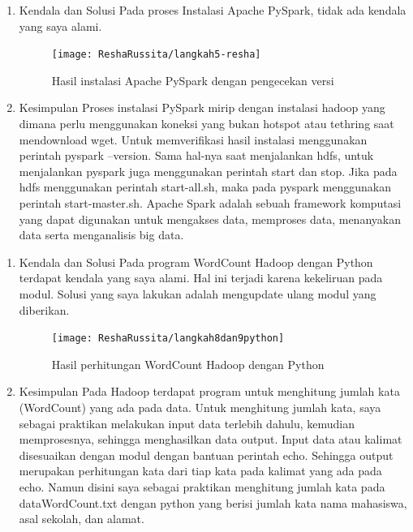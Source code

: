 \begin{enumerate}
\item Kendala dan Solusi
\newline Pada proses Instalasi Apache PySpark, tidak ada kendala yang saya alami.

\begin{figure}[!ht]
\texttt{[image: ReshaRussita/langkah5-resha]}
\caption{Hasil instalasi Apache PySpark dengan pengecekan versi}
\label{gam:perkuliahan-16-12}
\end{figure}

\item Kesimpulan
\newline Proses instalasi PySpark mirip dengan instalasi hadoop yang dimana perlu menggunakan koneksi yang bukan hotspot atau tethring saat mendownload wget. Untuk memverifikasi hasil instalasi menggunakan perintah pyspark --version. Sama hal-nya saat menjalankan hdfs, untuk menjalankan pyspark juga menggunakan perintah start dan stop. Jika pada hdfs menggunakan perintah start-all.sh, maka pada pyspark menggunakan perintah start-master.sh. Apache Spark adalah sebuah framework komputasi yang dapat digunakan untuk mengakses data, memproses data, menanyakan data serta menganalisis big data. 

\end{enumerate}

\begin{enumerate}
\item Kendala dan Solusi
\newline Pada program WordCount Hadoop dengan Python terdapat kendala yang saya alami. Hal ini terjadi karena kekeliruan pada modul. Solusi yang saya lakukan adalah mengupdate ulang modul yang diberikan.

\begin{figure}[!ht]
\texttt{[image: ReshaRussita/langkah8dan9python]}
\caption{Hasil perhitungan WordCount Hadoop dengan Python}
\label{gam:perkuliahan-22-12}
\end{figure}

\item Kesimpulan
\newline Pada Hadoop terdapat program untuk menghitung jumlah kata (WordCount) yang ada pada data. Untuk menghitung jumlah kata, saya sebagai praktikan melakukan input data terlebih dahulu, kemudian memprosesnya, sehingga menghasilkan data output. Input data atau kalimat disesuaikan dengan modul dengan bantuan perintah echo. Sehingga output merupakan perhitungan kata dari tiap kata pada kalimat yang ada pada echo. 
Namun disini saya sebagai praktikan menghitung jumlah kata pada dataWordCount.txt dengan python yang berisi jumlah kata nama mahasiswa, asal sekolah, dan alamat.

\end{enumerate}

